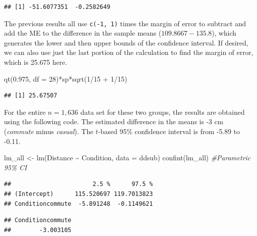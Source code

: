 \documentclass[
]{book}
\newenvironment{Shaded}{\begin{snugshade}}{\end{snugshade}}
\newcommand{\AttributeTok}[1]{\textcolor[rgb]{0.77,0.63,0.00}{#1}}
\newcommand{\CommentTok}[1]{\textcolor[rgb]{0.56,0.35,0.01}{\textit{#1}}}
\newcommand{\DecValTok}[1]{\textcolor[rgb]{0.00,0.00,0.81}{#1}}
\newcommand{\FloatTok}[1]{\textcolor[rgb]{0.00,0.00,0.81}{#1}}
\newcommand{\FunctionTok}[1]{\textcolor[rgb]{0.00,0.00,0.00}{#1}}
\newcommand{\NormalTok}[1]{#1}
\newcommand{\OtherTok}[1]{\textcolor[rgb]{0.56,0.35,0.01}{#1}}
\newcommand{\SpecialCharTok}[1]{\textcolor[rgb]{0.00,0.00,0.00}{#1}}
\begin{document}
\begin{verbatim}
## [1] -51.6077351  -0.2582649
\end{verbatim}

The previous results all use \texttt{c(-1,\ 1)} times the margin of error to subtract and add
the ME to the difference in the sample means (\(109.8667 - 135.8\)), which generates the
lower and then upper bounds of the confidence interval. If desired, we can also
use just the last portion of the calculation to find the margin of error,
which is 25.675 here.

\begin{Shaded}
\begin{Highlighting}[]
\FunctionTok{qt}\NormalTok{(}\FloatTok{0.975}\NormalTok{, }\AttributeTok{df =} \DecValTok{28}\NormalTok{)}\SpecialCharTok{*}\NormalTok{sp}\SpecialCharTok{*}\FunctionTok{sqrt}\NormalTok{(}\DecValTok{1}\SpecialCharTok{/}\DecValTok{15} \SpecialCharTok{+} \DecValTok{1}\SpecialCharTok{/}\DecValTok{15}\NormalTok{)}
\end{Highlighting}
\end{Shaded}

\begin{verbatim}
## [1] 25.67507
\end{verbatim}

\indent For the entire \(n = 1,636\) data set for these two groups, the results are obtained using the following code. The estimated difference in the means is -3 cm (\emph{commute} minus \emph{casual}). The \(t\)-based 95\% confidence interval is from -5.89 to -0.11.

\begin{Shaded}
\begin{Highlighting}[]
\NormalTok{lm\_all }\OtherTok{\textless{}{-}} \FunctionTok{lm}\NormalTok{(Distance }\SpecialCharTok{\textasciitilde{}}\NormalTok{ Condition, }\AttributeTok{data =}\NormalTok{ ddsub)}
\FunctionTok{confint}\NormalTok{(lm\_all) }\CommentTok{\#Parametric 95\% CI}
\end{Highlighting}
\end{Shaded}

\begin{verbatim}
##                       2.5 %      97.5 %
## (Intercept)      115.520697 119.7013823
## Conditioncommute  -5.891248  -0.1149621
\end{verbatim}

\begin{verbatim}
## Conditioncommute 
##        -3.003105
\end{verbatim}
\end{document}
